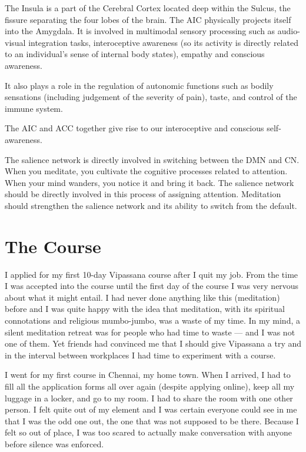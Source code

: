 \documentclass[a4paper, amsfonts, amssymb, amsmath, reprint, showkeys, nofootinbib, twoside]{revtex4-1}
\begin{document}
The Insula is a part of the Cerebral Cortex located deep within the Sulcus, the
fissure separating the four lobes of the brain. The AIC physically projects itself
into the Amygdala. It is involved in multimodal sensory processing such as
audio-visual integration tasks, interoceptive awareness (so its activity is directly
related to an individual's sense of internal body states), empathy and conscious
awareness. \cite{aicemotion}

It also plays a role in the regulation of autonomic functions such as bodily
sensations (including judgement of the severity of pain), taste, and control of the
immune system. \cite{aicautonomic}

The AIC and ACC together give rise to our interoceptive and conscious
self-awareness.  \cite{selfaware}

The salience network is directly involved in switching between the DMN and CN. 
When you meditate, you cultivate the cognitive processes related to attention.
When your mind wanders, you notice it and bring it back. 
The salience network should be directly involved in this process of assigning attention. 
Meditation should strengthen the salience network and its ability to switch from
the default. 


\section{The Course}

I applied for my first 10-day Vipassana course after I quit my job. From the time I
was accepted into the course until the first day of the course I was very nervous
about what it might entail. I had never done anything like this (meditation) before
and I was quite happy with the idea that meditation, with its spiritual connotations
and religious mumbo-jumbo, was a waste of my time. In my mind, a silent meditation retreat was
for people who had time to waste --- and I was not one of them. Yet friends had convinced me that I
should give Vipassana a try and in the interval between workplaces I had
time to experiment with a course.

I went for my first course in Chennai, my home town. When I arrived, I had to fill
all the application forms all over again (despite applying online), keep all my
luggage in a locker, and go to my room. I had to share the room with one other
person. I felt quite out of my element and I was certain everyone could see in me
that I was the odd one out, the one that was not supposed to be there. Because I felt
so out of place, I was too scared to actually make conversation with anyone before
silence was enforced.
\end{document}

